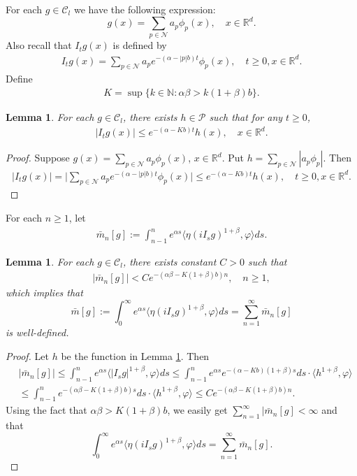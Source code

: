 \documentclass[12pt,a4paper]{amsart}
\theoremstyle{plain}
\newtheorem{lem}[thm]{Lemma}
\theoremstyle{definition}
\numberwithin{equation}{section}
\begin{document}
For each $g\in \mathcal{C}_l$ we have the following expression:
    $$g(x)=\sum_{p\in \mathcal{N}}a_p\phi_p(x), \quad x\in\mathbb{R}^d.$$
Also recall that $I_tg(x)$ is defined by
\begin{align}
    I_tg(x)=\sum_{p\in \mathcal{N}}a_pe^{-(\alpha-|p|b)t}\phi_p(x), \quad t\geq 0, x\in \mathbb{R}^d.
\end{align}
Define
\begin{align}
    K=\sup\{k\in \mathbb{N}: \alpha\beta>k(1+\beta)b\}.
\end{align}

\begin{lem}\label{lem: control of Isg}
 For each $g\in \mathcal{C}_l$, there exists $h\in \mathcal{P}$ such that  for any $t\geq 0$,
\begin{align}
    |I_tg(x)|\leq e^{-(\alpha-Kb)t}h(x),\quad x\in \mathbb{R}^d.
\end{align}
\end{lem}
\begin{proof}
Suppose $g(x)=\sum_{p\in \mathcal{N}}a_p\phi_p(x)$, $x\in\mathbb{R}^d$.  Put  $h=\sum_{p\in \mathcal{N}}|a_p\phi_p|$. Then
\begin{align}
    |I_tg(x)|=\Big|\sum_{p\in\mathcal{N}}a_pe^{-(\alpha-|p|b)t}\phi_p(x)\Big|\leq e^{-(\alpha-Kb)t}h(x),\quad t\geq 0,x\in \mathbb{R}^d.
\end{align}
\end{proof}
For each  $n\geq 1$, let
\begin{align}
    \bar{m}_n[g]:=\int_{n-1}^n e^{\alpha s}\langle \eta(iI_sg)^{1+\beta},\varphi\rangle ds.
\end{align}
\begin{lem}\label{lem: control of mn}
For each $g\in \mathcal{C}_l$,  there exists constant $C>0$ such that
 \begin{align}
     |\bar{m}_n[g]|< C e^{-(\alpha\beta-K(1+\beta)b)n}, \quad n\geq 1,
 \end{align}
which implies that
\begin{equation}\label{sum-bar-m}\bar{m}[g]:=\int_{0}^\infty e^{\alpha s}\langle \eta(iI_sg)^{1+\beta},\varphi\rangle ds=\sum_{n=1}^{\infty}\bar{m}_n[g]\end{equation}
is well-defined.
\end{lem}
\begin{proof}
Let $h$ be the function in Lemma \ref{lem: control of Isg}. Then
\begin{align}
    &|\bar{m}_n[g]|\leq \int_{n-1}^n e^{\alpha s}\langle |I_sg|^{1+\beta}, \varphi\rangle ds\leq \int_{n-1}^n e^{\alpha s}e^{-(\alpha-Kb)(1+\beta)s}ds\cdot \langle h^{1+\beta}, \varphi\rangle\\
    &\leq \int_{n-1}^n e^{-(\alpha\beta-K(1+\beta)b)s}ds\cdot\langle h^{1+\beta}, \varphi\rangle
    \leq C e^{-(\alpha\beta-K(1+\beta)b)n}.
\end{align}
Using  the fact that $\alpha\beta>K(1+\beta)b$, we easily get
$\sum_{n=1}^{\infty}|\bar{m}_n[g]<\infty$ and that  $$\int_{0}^\infty e^{\alpha s}\langle \eta(iI_sg)^{1+\beta},\varphi\rangle ds=\sum_{n=1}^{\infty}\bar{m}_n[g].$$
\end{proof}
\end{document}
